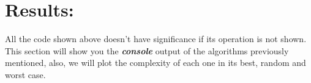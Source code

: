 \section{Results:}

All the code shown above doesn't have significance if its operation is not shown. This section will show you the {\bfseries\itshape console} output of the algorithms previously mentioned, also, we will plot the complexity of each one in its best, random and worst case. \hfill \break
